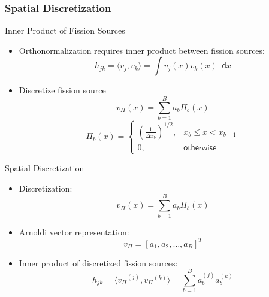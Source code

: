 \documentclass[xcolor={usenames, dvipsnames},]{beamer}
\newcommand{\dd}{\mathop{}\!\mathsf{d}}
\newcommand{\vP}{\ensuremath{v_{\Pi}}}
\begin{document}
\subsubsection{Spatial Discretization}
\begin{frame}{Inner Product of Fission Sources}
    \begin{itemize}
        \item Orthonormalization requires inner product between fission sources:
        \begin{equation*}
            h_{jk} = \langle v_j,v_k\rangle = \int v_j(x)v_k(x) \dd x
        \end{equation*}
    \item Discretize fission source
        \begin{equation*}
            \vP(x) = \sum_{b=1}^B a_b \Pi_b(x)
        \end{equation*}
        \begin{equation*}
            \Pi_b(x) = \begin{cases}
                \left(\frac{1}{\Delta x_b}\right)^{1/2}, & x_b \leq x < x_{b+1} \\
                0, & \mathsf{otherwise}
            \end{cases}
        \end{equation*}
    \end{itemize}
\end{frame}

\begin{frame}{Spatial Discretization}
    \begin{itemize}
        \item Discretization:
        \begin{equation*}
            \vP(x) = \sum_{b=1}^B a_b \Pi_b(x)
        \end{equation*}

        \item Arnoldi vector representation:
        \begin{equation*}
            \vP = \left[a_1, a_2, \ldots, a_B\right]^T
        \end{equation*}

        \item Inner product of discretized fission sources:
        \begin{equation*}
            h_{jk} = \langle \vP^{(j)},\vP^{(k)}\rangle = \sum_{b=1}^B a_b^{(j)}a_b^{(k)}
        \end{equation*}
    \end{itemize}
\end{frame}
\end{document}
